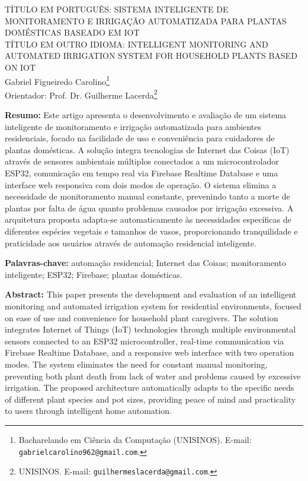 \documentclass[twoside,english,brazilian]{UNISINOSmonografia}
\begin{document}
\capa
\folhaderosto

\clearpage
\thispagestyle{plain}
\begin{center}
\MakeUppercase{TÍTULO EM PORTUGUÊS: Sistema Inteligente de Monitoramento e Irrigação Automatizada para Plantas Domésticas baseado em IoT}\\[0.75em]
\MakeUppercase{TÍTULO EM OUTRO IDIOMA: Intelligent Monitoring and Automated Irrigation System for Household Plants based on IoT}\\[1.5em]

Gabriel Figueiredo Carolino\footnote{Bacharelando em Ciência da Computação (UNISINOS). E-mail: \texttt{gabrielcarolino962@gmail.com}.} \\
Orientador: Prof. Dr. Guilherme Lacerda\footnote{UNISINOS. E-mail: \texttt{guilhermeslacerda@gmail.com}.}
\end{center}

\bigskip

\noindent\textbf{Resumo:} Este artigo apresenta o desenvolvimento e avaliação de um sistema inteligente de monitoramento e irrigação automatizada para ambientes residenciais, focado na facilidade de uso e conveniência para cuidadores de plantas domésticas. A solução integra tecnologias de Internet das Coisas (IoT) através de sensores ambientais múltiplos conectados a um microcontrolador ESP32, comunicação em tempo real via Firebase Realtime Database e uma interface web responsiva com dois modos de operação. O sistema elimina a necessidade de monitoramento manual constante, prevenindo tanto a morte de plantas por falta de água quanto problemas causados por irrigação excessiva. A arquitetura proposta adapta-se automaticamente às necessidades específicas de diferentes espécies vegetais e tamanhos de vasos, proporcionando tranquilidade e praticidade aos usuários através de automação residencial inteligente.

\medskip
\noindent\textbf{Palavras-chave:} automação residencial; Internet das Coisas; monitoramento inteligente; ESP32; Firebase; plantas domésticas.

\medskip
\noindent\textbf{Abstract:} This paper presents the development and evaluation of an intelligent monitoring and automated irrigation system for residential environments, focused on ease of use and convenience for household plant caregivers. The solution integrates Internet of Things (IoT) technologies through multiple environmental sensors connected to an ESP32 microcontroller, real-time communication via Firebase Realtime Database, and a responsive web interface with two operation modes. The system eliminates the need for constant manual monitoring, preventing both plant death from lack of water and problems caused by excessive irrigation. The proposed architecture automatically adapts to the specific needs of different plant species and pot sizes, providing peace of mind and practicality to users through intelligent home automation.
\end{document}
